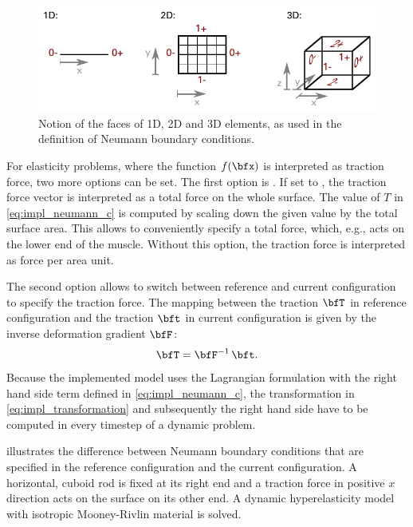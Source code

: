 \begin{figure}
  \centering%
  \includegraphics[width=\textwidth]{images/implementation/faces.pdf}%
  \caption{Notion of the faces of 1D, 2D and 3D elements, as used in the definition of Neumann boundary conditions.}%
  \label{fig:faces}%
\end{figure}%

For elasticity problems, where the function $f(\bfx)$ is interpreted as traction force, two more options can be set.
The first option is . If set to , the traction force vector is interpreted as a total force on the whole surface. The value of $T$ in \cref{eq:impl_neumann_c} is computed by scaling down the given value by the total surface area. This allows to conveniently specify a total force, which, e.g., acts on the lower end of the muscle. Without this option, the traction force is interpreted as force per area unit.

The second option  allows to switch between reference and current configuration to specify the traction force. The mapping between the traction $\bfT$ in reference configuration and the traction $\bft$ in current configuration is given by the inverse deformation gradient $\bfF$:%
\begin{align}\label{eq:impl_transformation}
  \bfT = \bfF^{-1}\,\bft.
\end{align}
Because the implemented model uses the Lagrangian formulation with the right hand side term defined in \cref{eq:impl_neumann_c}, the transformation in \cref{eq:impl_transformation} and subsequently the right hand side have to be computed in every timestep of a dynamic problem.

 illustrates the difference between Neumann boundary conditions that are specified in the  reference configuration and the current configuration. A horizontal, cuboid rod is fixed at its right end and a traction force in positive $x$ direction acts on the surface on its other end.
A dynamic hyperelasticity model with isotropic Mooney-Rivlin material is solved.

